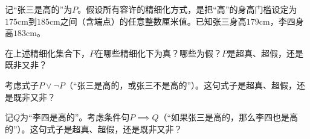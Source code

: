 \documentclass{quiz}
\begin{document}

记“张三是高的”为$P$。假设所有容许的精细化方式，是把“高”的身高门槛设定为$175$cm到$185$cm之间（含端点）的任意整数厘米值。已知张三身高$179$cm，李四身高$183$cm。

\begin{questions}
  
  \question 在上述精细化集合下，$P$在哪些精细化下为真？哪些为假？$P$是超真、超假，还是既非又非？
  \vspace{2in}
  
  \question 考虑式子$P \lor \neg P$（“张三是高的，或张三不是高的”）。这句式子是超真、超假，还是既非又非？
  \vspace{2in}
  
  \question 记$Q$为“李四是高的”。考虑条件句$P \implies Q$（“如果张三是高的，那么李四也是高的”）。这句式子是超真、超假，还是既非又非？


  
\end{questions}
\end{document}
